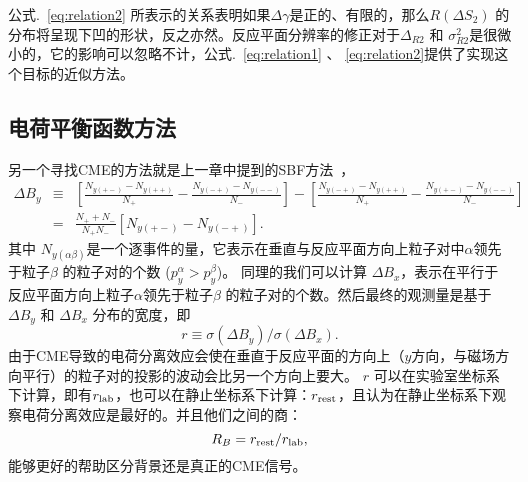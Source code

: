 公式.~\ref{eq:relation2} 所表示的关系表明如果$\Delta\gamma$是正的、有限的，那么$R(\Delta S_2)$ 的分布将呈现下凹的形状，反之亦然。反应平面分辨率的修正对于$\Delta_{R2}$ 和 $\sigma^2_{R2}$是很微小的，它的影响可以忽略不计，公式.~\ref{eq:relation1} 、 \ref{eq:relation2}提供了实现这个目标的近似方法。



\subsection{电荷平衡函数方法}

另一个寻找CME的方法就是上一章中提到的SBF方法~\cite{Tang2019}，
\begin{eqnarray}
\Delta B_y 
&\equiv& [\frac{N_{y(+-)}-N_{y(++)}}{N_+} - \frac{N_{y(-+)}-N_{y(--)}}{N_-}] - [\frac{N_{y(-+)}-N_{y(++)}}{N_+} - \frac{N_{y(+-)}-N_{y(--)}}{N_-}] \nonumber \\
&=& \frac{N_+ + N_-}{N_+N_-}[N_{y(+-)} - N_{y(-+)}].
\label{eq:by}
\end{eqnarray}
其中 $N_{y(\alpha\beta)}$是一个逐事件的量，它表示在垂直与反应平面方向上粒子对中$\alpha$领先于粒子$\beta$ 的粒子对的个数 ($p_y^\alpha > p_y^\beta$)。
同理的我们可以计算 $\Delta B_x$，表示在平行于反应平面方向上粒子$\alpha$领先于粒子$\beta$ 的粒子对的个数。然后最终的观测量是基于$\Delta B_y$ 和 $\Delta B_x$ 分布的宽度，即
\begin{equation}
r \equiv \sigma(\Delta B_y) / \sigma(\Delta B_x).
\label{rlab}
\end{equation}
由于CME导致的电荷分离效应会使在垂直于反应平面的方向上（$y$方向，与磁场方向平行）的粒子对的投影的波动会比另一个方向上要大。
$r$ 可以在实验室坐标系下计算，即有$r_{\rm lab}$，也可以在静止坐标系下计算：$r_{\rm rest}$，且认为在静止坐标系下观察电荷分离效应是最好的。并且他们之间的商：
\begin{equation}
R_B = r_{\rm rest} / r_{\rm lab},
\end{equation}
能够更好的帮助区分背景还是真正的CME信号。

